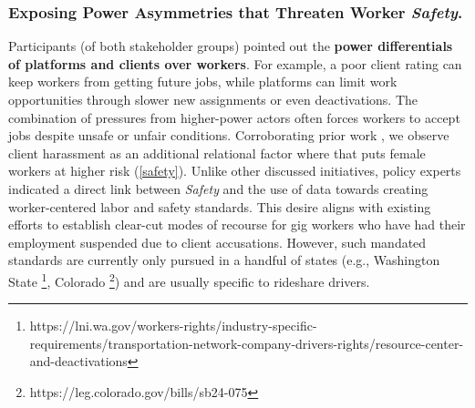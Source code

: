 \subsubsection{\textbf{{Exposing Power Asymmetries that Threaten Worker \textit{Safety}}.}}
{Participants (of both stakeholder groups) pointed out the \textbf{power differentials of platforms and clients over workers}. For example, a poor client rating can keep workers from getting future jobs, while platforms can limit work opportunities through slower new assignments or even deactivations. The combination of pressures from higher-power actors often forces workers to accept jobs despite unsafe or unfair conditions. Corroborating prior work \cite{5qBZ, disruption, privacy}, we observe client harassment as an additional relational factor where that puts female workers at higher risk (\ref{safety}). 
%
Unlike other discussed initiatives, policy experts indicated a direct link between \textit{Safety} and the use of data towards creating worker-centered labor and safety standards. This desire aligns with existing efforts to establish clear-cut modes of recourse for gig workers who have had their employment suspended due to client accusations. However, such mandated standards are currently only pursued in a handful of states (e.g., Washington State \footnote{https://lni.wa.gov/workers-rights/industry-specific-requirements/transportation-network-company-drivers-rights/resource-center-and-deactivations}, Colorado \footnote{https://leg.colorado.gov/bills/sb24-075}) and are usually specific to rideshare drivers. 

}
